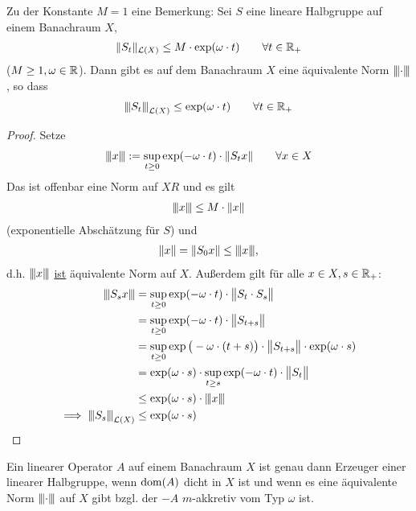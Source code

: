 \begin{bemerkung}
	Zu der Konstante $M=1$ eine Bemerkung: Sei $S$ eine lineare Halbgruppe auf einem Banachraum $X$,
	\begin{align*}
		\Vert S_t\Vert_{\L(X)}\leq M\cdot\exp(\omega\cdot t)\qquad\forall t\in\R_+
	\end{align*}
	($M\geq1,\omega\in\R$). 
	Dann gibt es auf dem Banachraum $X$ eine äquivalente Norm $\Vertiii{\cdot}$, so dass
	\begin{align*}
		\Vertiii{S_t}_{\L(X)}\leq\exp(\omega\cdot t)\qquad\forall t\in\R_+
	\end{align*} 
\end{bemerkung}

\begin{proof}
	Setze
	\begin{align*}
		\Vertiii{x}:=\sup\limits_{t\geq0}\exp(-\omega\cdot t)\cdot\Vert S_t x\Vert\qquad\forall x\in X
	\end{align*}
	Das ist offenbar eine Norm auf $XR$ und es gilt 
	\begin{align*}
		\Vertiii{x}\leq M\cdot\Vert x\Vert
	\end{align*}
	(exponentielle Abschätzung für $S$) und 
	\begin{align*}
		\Vert x\Vert=\Vert S_0 x\Vert\leq\Vertiii{x},
	\end{align*}
	d.h. $\Vertiii{x}$ \underline{ist} äquivalente Norm auf $X$. 
	Außerdem gilt für alle $x\in X, s\in\R_+$:
	\begin{align*}
		\Vertiii{S_s x}
		&=\sup\limits_{t\geq0}\exp(-\omega\cdot t)\cdot\big\Vert S_t\cdot S_s\big\Vert\\
		&=\sup\limits_{t\geq0}\exp(-\omega\cdot t)\cdot\big\Vert S_{t+s}\big\Vert\\
		&=\sup\limits_{t\geq0}\exp\big(-\omega\cdot(t+s)\big)\cdot\big\Vert S_{t+s}\big\Vert\cdot\exp(\omega\cdot s)\\
		&=\exp(\omega\cdot s)\cdot\sup\limits_{t\geq s}\exp(-\omega\cdot t)\cdot\big\Vert S_{t}\big\Vert\\\
		&\leq\exp(\omega\cdot s)\cdot\Vertiii{x}\\
		\implies \Vertiii{S_s}_{\L(X)}&\leq\exp(\omega\cdot s)
	\end{align*}
\end{proof}

\begin{theorem}[Ohne Namen]\enter
	Ein linearer Operator $A$ auf einem Banachraum $X$ ist genau dann Erzeuger einer linearer Halbgruppe, 
	wenn $\dom(A)$ dicht in $X$ ist und wenn es eine äquivalente Norm $\Vertiii{\cdot}$ auf $X$ gibt bzgl. der $-A$ $m$-akkretiv vom Typ $\omega$ ist.
\end{theorem}


